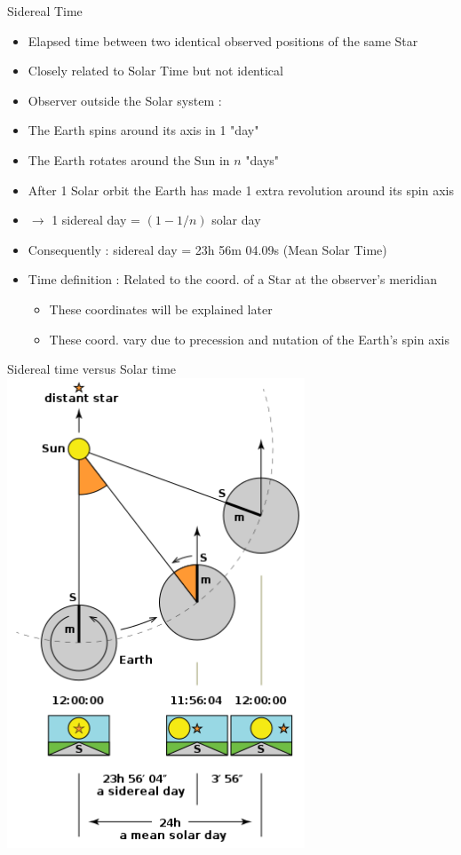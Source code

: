 \Tr
\begin{center}
{\red Sidereal Time}
\end{center}
%
\begin{itemize}
\item {\blue Elapsed time between two identical observed positions of the same Star}
\item[] Closely related to Solar Time but not identical
\item Observer outside the Solar system :
\item[] The Earth spins around its axis in 1 "day"
\item[] The Earth rotates around the Sun in $n$ "days"
\item[] After 1 Solar orbit the Earth has made 1 extra revolution around its spin axis
\item[] $\rightarrow$ 1 sidereal day = $(1-1/n)$ solar day
\item Consequently : { sidereal day = 23h 56m 04.09s (Mean Solar Time)}
\item[] Time definition : Related to the coord. of a Star at the observer's meridian
\begin{itemize}
\item These coordinates will be explained later
\item These coord. vary due to precession and nutation of the Earth's spin axis
\end{itemize}
\end{itemize}

\Tr
\onecolumn
\begin{center}
{\blue Sidereal time versus Solar time}\\[3mm]
\includegraphics[keepaspectratio,height=14cm]{siderial-time}
\end{center}

